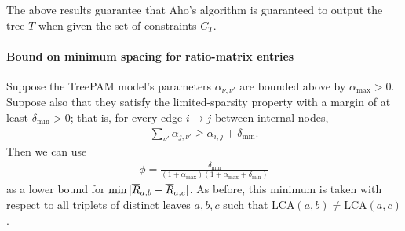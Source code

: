 \documentclass{article}
\theoremstyle{definition}
\newcommand{\deltaMin}{\delta_{\text{min}}}
\newcommand{\alphaMax}{\alpha_{\text{max}}}
\newcommand{\LCA}{\text{LCA}}
\begin{document}
The above results guarantee that Aho's algorithm is guaranteed to output the tree $T$ when given the set of constraints $C_T$.


\paragraph{Bound on minimum spacing for ratio-matrix entries}
Suppose the TreePAM model's parameters $\alpha_{\nu,\nu'}$ are bounded above by $\alphaMax > 0$.
Suppose also that they satisfy the limited-sparsity property with a margin of at least $\deltaMin > 0$; that is, for every edge $i \to j$ between internal nodes,
\begin{align*}
\sum_{\nu'} \alpha_{j,\nu'} \geq \alpha_{i,j} + \deltaMin.
\end{align*}
Then we can use
\begin{align*}
\phi = \frac{\deltaMin}{(1+\alphaMax)(1+\alphaMax+\deltaMin)}
\end{align*}
as a lower bound for $\min |\overline{R}_{a,b} - \overline{R}_{a,c}|$.
As before, this minimum is taken with respect to all triplets of distinct leaves $a, b, c$ such that $\LCA(a,b) \neq \LCA(a,c)$.
\end{document}
